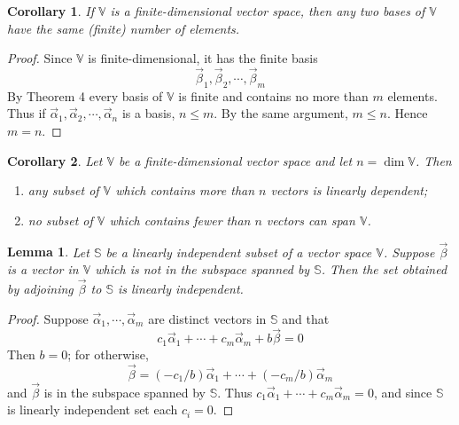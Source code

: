 \documentclass{article}
\newtheorem*{lemma}{Lemma}
\newtheorem{corollary}{Corollary}
\begin{document}
    \setcounter{corollary}{0}
    \begin{corollary}
        If \(\mathbb{V}\) is a finite-dimensional vector space, then any two bases of
        \(\mathbb{V}\) have the same (finite) number of elements.
    \end{corollary}
    \begin{proof}
        Since \(\mathbb{V}\) is finite-dimensional, it has the finite basis
        \begin{equation*}
            {\vec{\beta}_1, \vec{\beta}_2, \cdots, \vec{\beta}_m}
        \end{equation*}
        By Theorem 4 every basis of \(\mathbb{V}\) is finite and contains no more than 
        \(m\) elements. Thus if \({\vec{\alpha}_1, \vec{\alpha}_2, \cdots, \vec{\alpha}_n}\)
        is a basis, \(n \leq m\). By the same argument, \(m \leq n\). Hence \(m=n\).
    \end{proof}
    \begin{corollary}
        Let \(\mathbb{V}\) be a finite-dimensional vector space and let \(n=\dim{\mathbb{V}}\). Then 
        \begin{enumerate}
            \item any subset of \(\mathbb{V}\) which contains more than \(n\) vectors is linearly dependent;
            \item no subset of \(\mathbb{V}\) which contains fewer than \(n\) vectors can span \(\mathbb{V}\).
        \end{enumerate}
    \end{corollary}
    \begin{lemma}
        Let \(\mathbb{S}\) be a linearly independent subset of a vector space \(\mathbb{V}\).
        Suppose \(\vec{\beta}\) is a vector in \(\mathbb{V}\) which is not in the subspace
        spanned by \(\mathbb{S}\). Then the set obtained by adjoining \(\vec{\beta}\) to 
        \(\mathbb{S}\) is linearly independent.
    \end{lemma}
    \begin{proof}
        Suppose \(\vec{\alpha}_1, \cdots, \vec{\alpha}_m\) are distinct vectors in \(\mathbb{S}\) and that 
        \begin{equation*}
            c_1 \vec{\alpha}_1 + \cdots + c_m \vec{\alpha}_m + b \vec{\beta} = 0
        \end{equation*}
        Then \(b=0\); for otherwise,
        \begin{equation*}
            \vec{\beta} = (-c_1/b)\vec{\alpha}_1 + \cdots + (-c_m/b)\vec{\alpha}_m
        \end{equation*}
        and \(\vec{\beta}\) is in the subspace spanned by \(\mathbb{S}\). Thus 
        \(c_1 \vec{\alpha}_1 + \cdots + c_m \vec{\alpha}_m = 0\), and since \(\mathbb{S}\) 
        is linearly independent set each \(c_i=0\).
    \end{proof}
\end{document}
